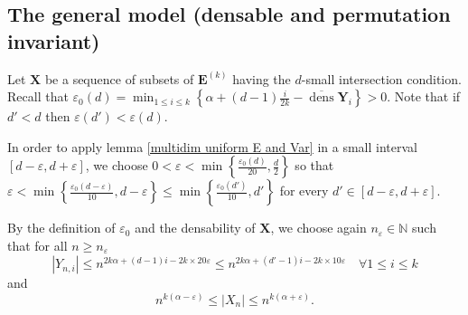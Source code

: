 \documentclass{article}
\DeclareMathOperator{\dens}{dens}
\newcommand{\bs}{\boldsymbol}
\theoremstyle{remark}
\begin{document}
\subsection{The general model (densable and permutation invariant)}
Let $\bs X$ be a sequence of subsets of $\bs E^{(k)}$ having the $d$-small intersection condition. Recall that $\varepsilon_0(d) = \min_{1\leq i \leq k}\left\{\alpha + (d-1)\frac{i}{2k}-\overline{\dens} \bs Y_i\right\} > 0$. Note that if $d'<d$ then $\varepsilon(d')<\varepsilon(d)$.

In order to apply lemma \ref{multidim uniform E and Var} in a small interval $[d-\varepsilon,d+\varepsilon]$, we choose $0<\varepsilon<\min\left\{ \frac{\varepsilon_0(d)}{20}, \frac{d}{2}\right\}$ so that $\varepsilon < \min\left\{ \frac{\varepsilon_0(d-\varepsilon)}{10}, d-\varepsilon \right\} \leq \min\left\{\frac{\varepsilon_0(d')}{10},d'\right\}$ for every $d'\in [d-\varepsilon,d+\varepsilon]$.

By the definition of $\varepsilon_0$ and the densability of $\bs X$, we choose again $n_\varepsilon\in \mathbb{N}$ such that for all $n\geq n_\varepsilon$
\[|Y_{n,i}|\leq n^{2k\alpha + (d-1)i-2k\times 20\varepsilon} \leq n^{2k\alpha + (d'-1)i-2k\times 10\varepsilon}\quad \forall 1\leq i \leq k\]
and
\[n^{k(\alpha-\varepsilon)}\leq |X_n|\leq n^{k(\alpha+\varepsilon)}.\]
\end{document}
